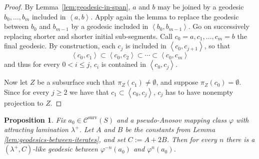 \documentclass{amsart}
\newcommand{\C}{\mathcal{C}}
\newcommand{\Span}[1]{\left\langle #1\right\rangle}
\newcommand{\Csurv}{\C^{\text{surv}}}
\newtheorem{prop}[thm]{Proposition}
\theoremstyle{definition}
\begin{document}
\begin{proof}
By Lemma~\ref{lem:geodesic-in-span}, $a$ and $b$ may be joined by a geodesic 
\(b_0,\dots, b_m\) included in \(\Span{a,b}\). Apply again the lemma to replace the geodesic between $b_0$ and $b_{m-1}$ by a geodesic included in \(\Span{b_0,b_{m-1}}\). Go on successively replacing shorter and shorter initial sub-segments.
Call \(c_0=a,c_1,\dots,c_m=b\) the final geodesic. By construction, each $c_j$ is included in $\Span{c_0, c_{j+1}}$, so that 
\[
\Span{c_0, c_1} \subset \Span{c_0, c_2} \subset \cdots \subset \Span{c_0, c_m}
\]
and thus for every \(0<i\leq j\), \(c_i\) is contained in \(\Span{c_0,c_j}\).


Now let \(Z\) be a subsurface such that \(\pi_Z(c_1)\neq \emptyset\), and suppose \(\pi_Z(c_0)=\emptyset\). Since for every \(j\geq 2\) we have that \(c_1\subset \Span{c_0,c_j}\), \(c_j\) has to have nonempty projection to \(Z\). 
\end{proof}


\begin{prop}\label{prop:exist-geo}
Fix \(a_0\in\Csurv(S)\) and a pseudo-Anosov mapping class \(\varphi\) with attracting lamination \(\lambda^+\). Let \(A\) and \(B\) be the constants from Lemma \ref{lem:geodesics-between-iterates}, and set \(C:=A+2B\). Then for every \(n\) there is a \((\lambda^+,C)\)-like geodesic between \(\varphi^{-n}(a_0)\) and \(\varphi^n(a_0)\).
\end{prop}
\end{document}
